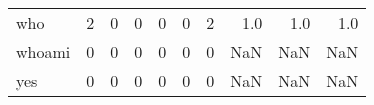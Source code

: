 \begin{longtable}{lrrrrrrrrr}
who       &                                                  2 &                                                  0 &                                                  0 &                                                  0 &                                                  0 &                                                  2 &                                                1.0 &                                    1.0 &                                  1.0 \\
whoami    &                                                  0 &                                                  0 &                                                  0 &                                                  0 &                                                  0 &                                                  0 &                                                NaN &                                    NaN &                                  NaN \\
yes       &                                                  0 &                                                  0 &                                                  0 &                                                  0 &                                                  0 &                                                  0 &                                                NaN &                                    NaN &                                  NaN \\
\end{longtable}
